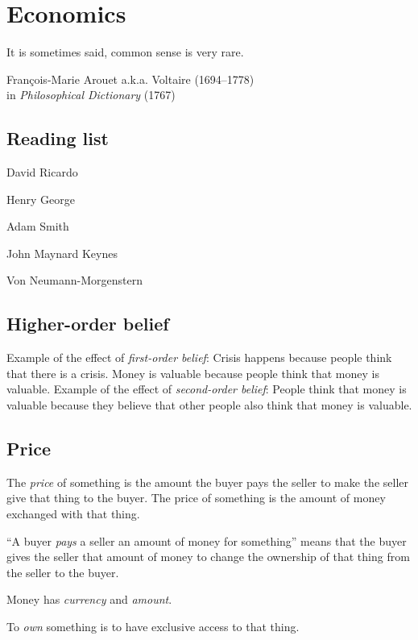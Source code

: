 \chapter{Economics}

\epigraph{It is sometimes said, common sense is very rare.}{François-Marie Arouet a.k.a. Voltaire (1694--1778)\\in \emph{Philosophical Dictionary} (1767)}

\section{Reading list}

David Ricardo

Henry George

Adam Smith

John Maynard Keynes

Von Neumann-Morgenstern

\section{Higher-order belief}

%
%
%
%
Example of the effect of \emph{first-order belief}:
Crisis happens because people think that there is a crisis.
Money is valuable because people think that money is valuable.
%
%
%
Example of the effect of \emph{second-order belief}:
People think that money is valuable because
they believe that other people also think that money is valuable.

\section{Price}

The \emph{price} of something is the amount the buyer
pays the seller to make the seller give that thing to the buyer.
The price of something is the amount of money exchanged with that thing.

``A buyer \emph{pays} a seller an amount of money for something'' means
that the buyer gives the seller that amount of money
to change the ownership of that thing from the seller to the buyer.

Money has \emph{currency} and \emph{amount}.

To \emph{own} something is to have exclusive access to that thing.

